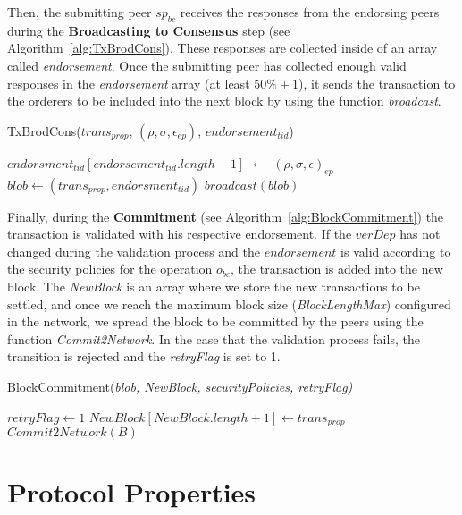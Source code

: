 \documentclass[conference]{IEEEtran}
\begin{document}
Then, the submitting peer $sp_{bc}$ receives the responses from the endorsing peers during the \textbf{Broadcasting to Consensus} step (see Algorithm~\ref{alg:TxBrodCons}). These responses are collected inside of an array called \textit{endorsement}. Once the submitting peer has collected enough valid responses in the \textit{endorsement} array (at least $50\%+1$), it sends the transaction to the orderers to be included into the next block by using the function \textit{broadcast}. 

\begin{algorithm}[ht]
\caption{TxBrodCons($trans_{prop}$, $(\rho,\sigma,\epsilon_{ep})$, $endorsement_{tid}$)}
\label{alg:TxBrodCons}
\begin{algorithmic}[1]
\STATE $endorsment_{tid}[endorsement_{tid}.length+1]$ $\gets$ $(\rho,\sigma,\epsilon)_{ep}$
\STATE $blob \gets (trans_{prop},endorsment_{tid})$
\RETURN $broadcast(blob)$
\ENDIF
\end{algorithmic}
\end{algorithm}

Finally, during the \textbf{Commitment} (see Algorithm~\ref{alg:BlockCommitment}) the transaction is validated with his respective endorsement. If the $verDep$ has not changed during the validation process and the $endorsement$ is valid according to the security policies for the operation $o_{bc}$, the transaction is added into the new block. The \textit{NewBlock} is an array where we store the new transactions to be settled, and once we reach the maximum block size (\textit{BlockLengthMax}) configured in the network, we spread the block to be committed by the peers using the function \textit{Commit2Network}. In the case that the validation process fails, the transition is rejected and the \textit{retryFlag} is set to 1. 

\begin{algorithm}[ht]
\caption{BlockCommitment(\emph{blob, NewBlock, securityPolicies, retryFlag)}}
\label{alg:BlockCommitment}
\begin{algorithmic}[1]
\RETURN $retryFlag \gets 1$
\ELSE \STATE $NewBlock [NewBlock.length + 1] \gets trans_{prop}$ \ENDIF
{}
\RETURN $Commit2Network(B)$ \ENDIF
\end{algorithmic}
\end{algorithm}

\section{Protocol Properties}
\label{PROP}
\end{document}
